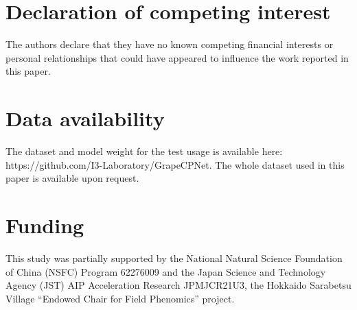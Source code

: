 \documentclass[12pt]{article}
\begin{document}
\section*{Declaration of competing interest}
The authors declare that they have no known competing financial interests or personal relationships that could have appeared to influence the work reported in this paper.

\section*{Data availability}
The dataset and model weight for the test usage is available here: https://github.com/I3-Laboratory/GrapeCPNet. The whole dataset used in this paper is available upon request.

\section*{Funding}
This study was partially supported by the National Natural Science Foundation of China (NSFC) Program 62276009 and the Japan Science and Technology Agency (JST) AIP Acceleration Research JPMJCR21U3, the Hokkaido Sarabetsu Village ``Endowed Chair for Field Phenomics'' project.

{\clearpage}



\end{document}
